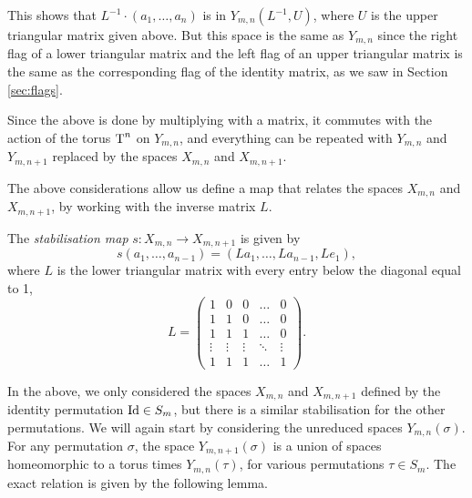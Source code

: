 This shows that $L^{-1}\cdot(a_1,\dots,a_{n})$ is in
$Y_{m,n}(L^{-1},U)$, where $U$ is the
upper triangular matrix given above. But this space is the same as
$Y_{m,n}$ since the right flag of a lower triangular matrix and the
left flag of an upper triangular matrix
is the same as the corresponding flag of the identity
matrix, as we saw in Section \ref{sec:flags}.

Since the above is done by multiplying with a matrix, it commutes with
the action of the torus $\operatorname{T}^n$ on $Y_{m,n}$, and everything can be
repeated with $Y_{m,n}$ and $Y_{m,n+1}$ replaced by the spaces
$X_{m,n}$ and $X_{m,n+1}$.

The above considerations allow us define a map that relates the spaces
$X_{m,n}$ and $X_{m,n+1}$, by working with the inverse matrix $L$.
\begin{definition}
  \label{def:stabilisering}
  The \textit{stabilisation map} $s : X_{m,n} \to X_{m,n+1}$ is given
  by
  \[ s\left(a_1,\dots,a_{n-1}\right) =
  \left(La_1,\dots,La_{n-1},Le_1\right), \]
  where $L$ is the lower triangular matrix with every entry below the
  diagonal equal to 1,
  \[ L =
  \begin{pmatrix}
    1 & 0 & 0 & \dots & 0 \\
    1 & 1 & 0 & \dots & 0 \\
    1 & 1 & 1 & \dots & 0 \\
    \vdots & \vdots & \vdots & \ddots & \vdots \\
    1 & 1 & 1 & \dots & 1
  \end{pmatrix}. \]
\end{definition}

In the above, we only considered the spaces $X_{m,n}$ and $X_{m,n+1}$
defined by the identity permutation $\operatorname{Id}\in S_m$,
but there is a similar stabilisation for the other permutations. We
will again start by considering the unreduced spaces
$Y_{m,n}(\sigma)$. For
any permutation $\sigma$, the space $Y_{m,n+1}(\sigma)$ is a union of
spaces homeomorphic to a torus times $Y_{m,n}(\tau)$, for various
permutations $\tau\in S_m$. The exact relation is given by the
following lemma.

